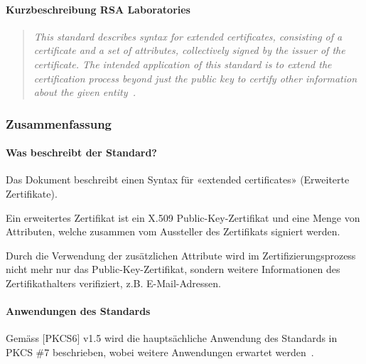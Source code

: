 \documentclass[10pt,a4paper]{article}
\begin{document}
\paragraph{Kurzbeschreibung RSA Laboratories}
\begin{quotation}
    \itshape This standard describes syntax for extended certificates, consisting of a
    certificate and a set of attributes, collectively signed by the issuer of the
    certificate. The intended application of this standard is to extend the certification
    process beyond just the public key to certify other information about the given
    entity~\cite{pkcs6}.
\end{quotation}

\subsubsection{Zusammenfassung}

\paragraph{Was beschreibt der Standard?}
Das Dokument beschreibt einen Syntax für «extended certificates» (Erweiterte Zertifikate).

Ein erweitertes Zertifikat ist ein X.509 Public-Key-Zertifikat und eine Menge von
Attributen, welche zusammen vom Aussteller des Zertifikats signiert werden.

Durch die Verwendung der zusätzlichen Attribute wird im Zertifizierungsprozess nicht mehr
nur das Public-Key-Zertifikat, sondern weitere Informationen des Zertifikathalters
verifiziert, z.B. E-Mail-Adressen.

\paragraph{Anwendungen des Standards}
Gemäss [PKCS6] v1.5 wird die hauptsächliche Anwendung des Standards in PKCS \#7
beschrieben, wobei weitere Anwendungen erwartet werden~\cite[S.1]{pkcs6}.
\end{document}
